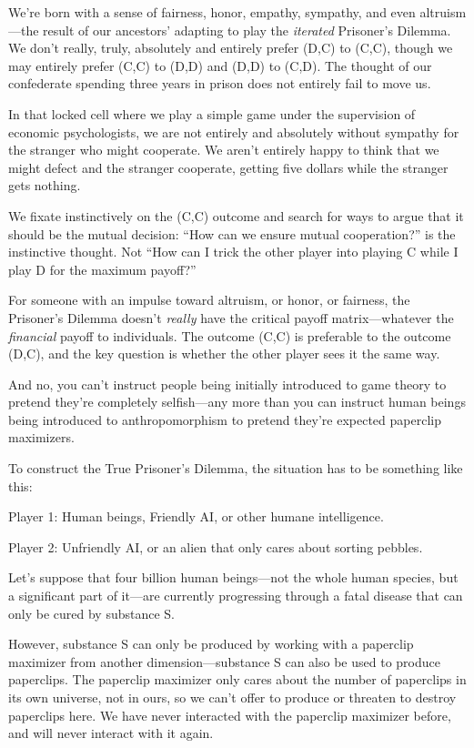 {
 We're born with a sense of fairness, honor,
empathy, sympathy, and even altruism---the result of our
ancestors' adapting to play the \textit{iterated}
Prisoner's Dilemma. We don't really,
truly, absolutely and entirely prefer (D,C) to (C,C), though we may
entirely prefer (C,C) to (D,D) and (D,D) to (C,D). The thought of our
confederate spending three years in prison does not entirely fail to
move us.}

{
 In that locked cell where we play a simple game under the
supervision of economic psychologists, we are not entirely and
absolutely without sympathy for the stranger who might cooperate. We
aren't entirely happy to think that we might defect and
the stranger cooperate, getting five dollars while the stranger gets
nothing.}

{
 We fixate instinctively on the (C,C) outcome and search for ways
to argue that it should be the mutual decision: ``How
can we ensure mutual cooperation?'' is the
instinctive thought. Not ``How can I trick the other
player into playing C while I play D for the maximum
payoff?''}

{
 For someone with an impulse toward altruism, or honor, or
fairness, the Prisoner's Dilemma
doesn't \textit{really} have the critical payoff
matrix---whatever the \textit{financial} payoff to individuals. The
outcome (C,C) is preferable to the outcome (D,C), and the key question
is whether the other player sees it the same way.}

{
 And no, you can't instruct people being initially
introduced to game theory to pretend they're completely
selfish---any more than you can instruct human beings being introduced
to anthropomorphism to pretend they're expected
paperclip maximizers.}

{
 To construct the True Prisoner's Dilemma, the
situation has to be something like this:}

{
 Player 1: Human beings, Friendly AI, or other humane
intelligence.}

{
 Player 2: Unfriendly AI, or an alien that only cares about sorting
pebbles.}

{
 Let's suppose that four billion human beings---not
the whole human species, but a significant part of it---are currently
progressing through a fatal disease that can only be cured by substance
S.}

{
 However, substance S can only be produced by working with a
paperclip maximizer from another dimension---substance S can also be
used to produce paperclips. The paperclip maximizer only cares about
the number of paperclips in its own universe, not in ours, so we
can't offer to produce or threaten to destroy
paperclips here. We have never interacted with the paperclip maximizer
before, and will never interact with it again.}

